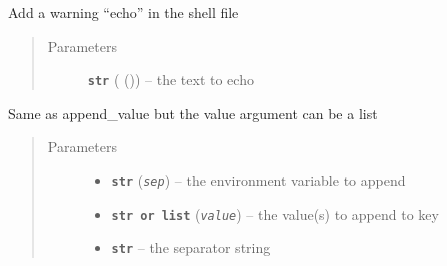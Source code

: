 \documentclass[a4paper,10pt,english]{sphinxmanual}
\begin{document}
\begin{fulllineitems}
\begin{fulllineitems}
\begin{quote}
\begin{description}
\end{description}\end{quote}

\end{fulllineitems}


\begin{fulllineitems}
\label{commands/apidoc/src:src.fileEnviron.FileEnviron.add_warning}
Add a warning ``echo'' in the shell file
\begin{quote}\begin{description}
\item[{Parameters}] \leavevmode
\textbf{\texttt{str}} ({\hyperref[commands/apidoc/src:src.utilsSat.warning]{}} ()) -- the text to echo

\end{description}\end{quote}

\end{fulllineitems}


\begin{fulllineitems}
\label{commands/apidoc/src:src.fileEnviron.FileEnviron.append}
Same as append\_value but the value argument can be a list
\begin{quote}\begin{description}
\item[{Parameters}] \leavevmode\begin{itemize}
\item {} 
\textbf{\texttt{str}} (\emph{\texttt{sep}}) -- the environment variable to append

\item {} 
\textbf{\texttt{str or list}} (\emph{\texttt{value}}) -- the value(s) to append to key

\item {} 
\textbf{\texttt{str}} -- the separator string

\end{itemize}

\end{description}\end{quote}


\end{fulllineitems}
\end{fulllineitems}
\end{document}
